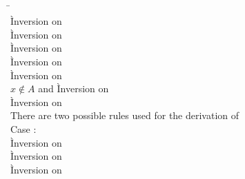 \begin{description}
\begin{tabbing}
  \end{tabbing}

\item[\rulesteppushdecl] \ \\
  \newcommand{\pushdeclstack}{\framevar{F}{x}{\tau_x}}
  \begin{tabbing}
  \hspace{3em} \= \hspace{3em} \= \\
    \` Inversion on  \\
    \` Inversion on  \\
    \` Inversion on  \\
    \` Inversion on  \\
    \` Inversion on  \\
  $x \not\in A$ and 
    \` Inversion on  \\
    \` Inversion on  \\
  There are two possible rules used for the derivation of
      \\
  Case : \+ \\
      \` Inversion on  \\
      \` Inversion on  \\
      \` Inversion on  \\

\end{tabbing}
\end{description}

